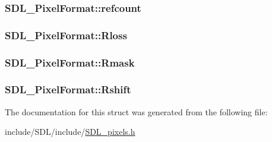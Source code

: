 \hypertarget{struct_s_d_l___pixel_format_a23be8060443d58064a720a4e2ef31729}{
\subsubsection[{refcount}]{ S\-D\-L\-\_\-\-Pixel\-Format\-::refcount}}\label{struct_s_d_l___pixel_format_a23be8060443d58064a720a4e2ef31729}
\hypertarget{struct_s_d_l___pixel_format_a9994b4ed87a2551253aebfa191db8424}{
\subsubsection[{Rloss}]{ S\-D\-L\-\_\-\-Pixel\-Format\-::\-Rloss}}\label{struct_s_d_l___pixel_format_a9994b4ed87a2551253aebfa191db8424}
\hypertarget{struct_s_d_l___pixel_format_a35e5793f6e9c356aec2d130167174946}{
\subsubsection[{Rmask}]{ S\-D\-L\-\_\-\-Pixel\-Format\-::\-Rmask}}\label{struct_s_d_l___pixel_format_a35e5793f6e9c356aec2d130167174946}
\hypertarget{struct_s_d_l___pixel_format_abfdec7b9ee2ee39db630f4022e4e0daa}{
\subsubsection[{Rshift}]{ S\-D\-L\-\_\-\-Pixel\-Format\-::\-Rshift}}\label{struct_s_d_l___pixel_format_abfdec7b9ee2ee39db630f4022e4e0daa}


The documentation for this struct was generated from the following file\-:\begin{DoxyCompactItemize}
\item 
include/\-S\-D\-L/include/\hyperlink{_s_d_l__pixels_8h}{S\-D\-L\-\_\-pixels.\-h}\end{DoxyCompactItemize}
